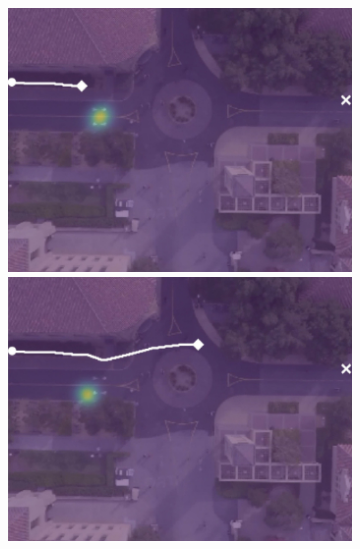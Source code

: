 \documentclass[letterpaper,10pt,conference]{ieeeconf}
\begin{document}
\begin{figure}[t!]
\begin{subfigure}[t]{0.48\textwidth}
	\vspace{0.1cm}
	\begin{minipage}[c]{0.47cm}
	\end{minipage}
	\begin{minipage}[c]{0.3\linewidth}
		\includegraphics[width=\linewidth]{./figures/comparison/lstm_1_2_t=100.jpg}
	\end{minipage}
	\begin{minipage}[c]{0.3\linewidth}
		\includegraphics[width=\linewidth]{./figures/comparison/lstm_1_2_t=300.jpg}
	\end{minipage}
	\begin{minipage}[c]{0.3\linewidth}

\end{minipage}
\end{subfigure}
\end{figure}
\end{document}
